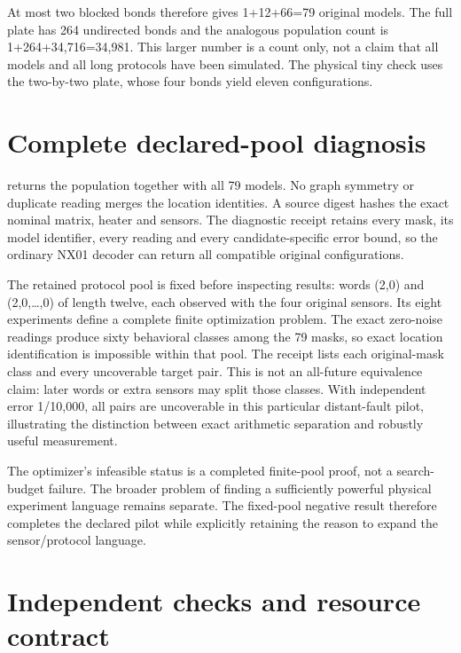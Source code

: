 \documentclass[
  11pt,
  a4paper,
]{report}
\let\singularitytexttt\texttt
\renewcommand{\texttt}[1]{\singularitytexttt{\seqsplit{#1}}}
\begin{document}
At most two blocked bonds therefore gives 1+12+66=79 original models.
The full plate has 264 undirected bonds and the analogous population
count is 1+264+34,716=34,981. This larger number is a count only, not a
claim that all models and all long protocols have been simulated. The
physical tiny check uses the two-by-two plate, whose four bonds yield
eleven configurations.

\hypertarget{complete-declared-pool-diagnosis}{%
\section{Complete declared-pool
diagnosis}\label{complete-declared-pool-diagnosis}}

\texttt{pilot\_fault\_candidates(12)} returns the population together
with all 79 \texttt{AffineCandidate} models. No graph symmetry or
duplicate reading merges the location identities. A source digest hashes
the exact nominal matrix, heater and sensors. The diagnostic receipt
retains every mask, its model identifier, every reading and every
candidate-specific error bound, so the ordinary NX01 decoder can return
all compatible original configurations.

The retained protocol pool is fixed before inspecting results: words
(2,0) and (2,0,\ldots,0) of length twelve, each observed with the four
original sensors. Its eight experiments define a complete finite
optimization problem. The exact zero-noise readings produce sixty
behavioral classes among the 79 masks, so exact location identification
is impossible within that pool. The receipt lists each original-mask
class and every uncoverable target pair. This is not an all-future
equivalence claim: later words or extra sensors may split those classes.
With independent error 1/10,000, all pairs are uncoverable in this
particular distant-fault pilot, illustrating the distinction between
exact arithmetic separation and robustly useful measurement.

The optimizer's infeasible status is a completed finite-pool proof, not
a search-budget failure. The broader problem of finding a sufficiently
powerful physical experiment language remains separate. The fixed-pool
negative result therefore completes the declared pilot while explicitly
retaining the reason to expand the sensor/protocol language.

\hypertarget{independent-checks-and-resource-contract}{%
\section{Independent checks and resource
contract}\label{independent-checks-and-resource-contract}}
\end{document}
